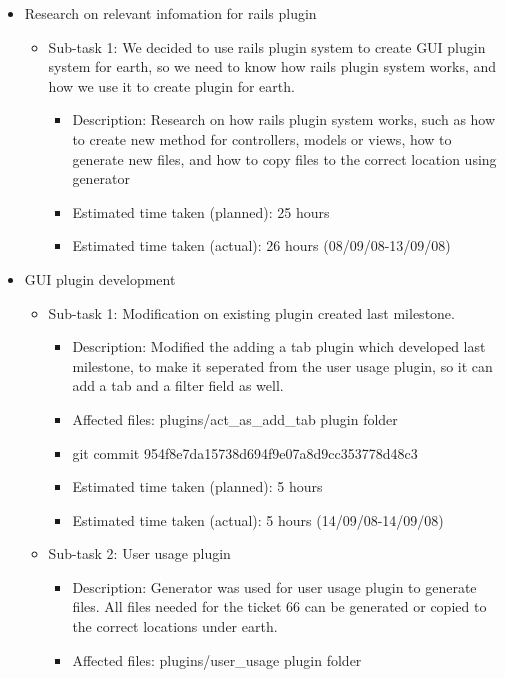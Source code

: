 \documentclass{article}
\begin{document}
\begin{itemize}
	\item Research on relevant infomation for rails plugin
	     \begin{itemize}
	        \item Sub-task 1: We decided to use rails plugin system to create GUI plugin system for earth, so we need to know how rails plugin system works, and how we use it to create plugin for earth.
	           \begin{itemize}
					\item Description: Research on how rails plugin system works, such as how to create new method for controllers, models or views, how to generate new files, and how to copy files to the correct location using generator
					\item Estimated time taken (planned): 25 hours
					\item Estimated time taken (actual):  26 hours (08/09/08-13/09/08)
				\end{itemize}
	     \end{itemize}
	\item GUI plugin development
	     \begin{itemize}
	         \item Sub-task 1: Modification on existing plugin created last milestone.
	            \begin{itemize}
	              \item Description: Modified the adding a tab plugin which developed last milestone, to make it seperated from the user usage plugin, so it can add a tab and a filter field as well.
					\item Affected files: plugins/act\_as\_add\_tab plugin folder
					\item git commit 954f8e7da15738d694f9e07a8d9cc353778d48c3
					\item Estimated time taken (planned): 5 hours
					\item Estimated time taken (actual): 5 hours (14/09/08-14/09/08)
				 \end{itemize}
	         \item Sub-task 2: User usage plugin
	            \begin{itemize}
				    \item Description: Generator was used for user usage plugin to generate files. All files needed for the ticket 66 can be generated or copied to the correct locations under earth.
					\item Affected files: plugins/user\_usage plugin folder

\end{itemize}
\end{itemize}
\end{itemize}
\end{document}
